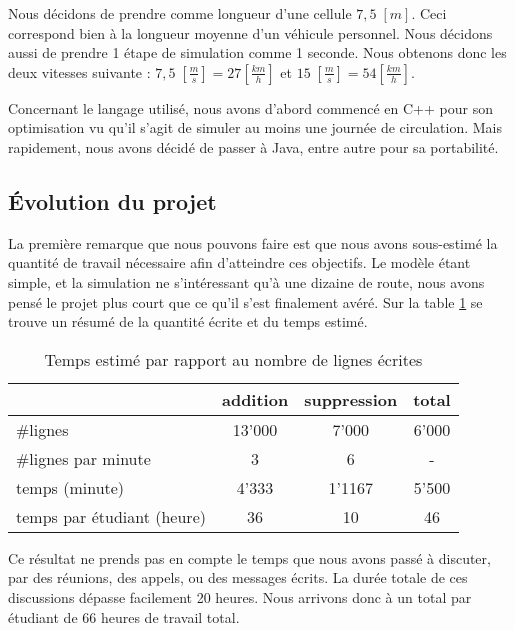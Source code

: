 \documentclass[a4paper,11pt]{extarticle}
\begin{document}
\noindent
Nous décidons de prendre comme longueur d'une cellule $7,5 \; [m]$. Ceci correspond bien à la longueur moyenne d'un véhicule personnel. Nous décidons aussi de prendre 1 étape de simulation comme 1 seconde. Nous obtenons donc les deux vitesses suivante : $7,5 \; [\frac{m}{s}] = 27 [\frac{km}{h}]$ et $15 \; [\frac{m}{s}] = 54 [\frac{km}{h}]$.\newline

\noindent
Concernant le langage utilisé, nous avons d'abord commencé en C++ pour son optimisation vu qu'il s'agit de simuler au moins une journée de circulation. Mais rapidement, nous avons décidé de passer à Java, entre autre pour sa portabilité.

\subsection*{Évolution du projet}

La première remarque que nous pouvons faire est que nous avons sous-estimé la quantité de travail nécessaire afin d'atteindre ces objectifs. Le modèle étant simple, et la simulation ne s'intéressant qu'à une dizaine de route, nous avons pensé le projet plus court que ce qu'il s'est finalement avéré. Sur la table \ref{tabTemps} se trouve un résumé de la quantité écrite et du temps estimé.

\begin{table}[h!]
\begin{center}
\begin{tabular}{|l|c|c|c|}
\hline
 & addition & suppression & total\\ \hline
\#lignes & 13'000 & 7'000 & 6'000\\ \hline
\#lignes par minute & 3 & 6 & - \\ \hline\hline
temps (minute) & 4'333 & 1'1167 & 5'500\\ \hline
temps par étudiant (heure) & 36 & 10 & 46\\ \hline
\end{tabular}
\end{center}
\caption{Temps estimé par rapport au nombre de lignes écrites}
\label{tabTemps}
\end{table}

Ce résultat ne prends pas en compte le temps que nous avons passé à discuter, par des réunions, des appels, ou des messages écrits. La durée totale de ces discussions dépasse facilement 20 heures. Nous arrivons donc à un total par étudiant de 66 heures de travail total.
\end{document}
